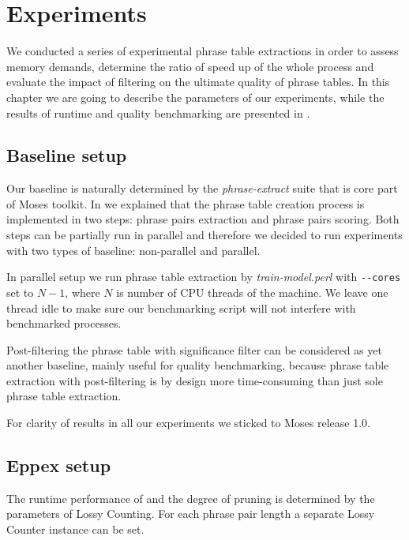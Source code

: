 \chapter{Experiments}
\label{chap:experiments}

We conducted a series of experimental phrase table extractions in order to
assess \eppex{} memory demands, determine the ratio of speed up of the whole
process and evaluate the impact of filtering on the ultimate quality of phrase
tables.
In this chapter we are going to describe the parameters of our experiments,
while the results of runtime and quality benchmarking are presented in
.

\section{Baseline setup}

Our baseline is naturally determined by the \emph{phrase-extract} suite that
is core part of Moses toolkit.
In  we explained that the phrase table creation process
is implemented in two steps: phrase pairs extraction and phrase pairs scoring.
Both steps can be partially run in parallel and therefore we decided to run
experiments with two types of baseline: non-parallel and parallel.

In parallel setup we run phrase table extraction by \emph{train-model.perl}
with \verb|--cores| set to $N-1$, where $N$ is number of CPU threads of the machine.
We leave one thread idle to make sure our benchmarking script will not interfere
with benchmarked processes.

Post-filtering the phrase table with significance filter can be considered as
yet another baseline, mainly useful for quality benchmarking, because
phrase table extraction with post-filtering is by design more time-consuming
than just sole phrase table extraction.

For clarity of results in all our experiments we sticked to Moses release 1.0.

\section{Eppex setup}

The runtime performance of \eppex{} and the degree of pruning is determined
by the parameters of Lossy Counting.
For each phrase pair length a separate Lossy Counter instance can be set.

